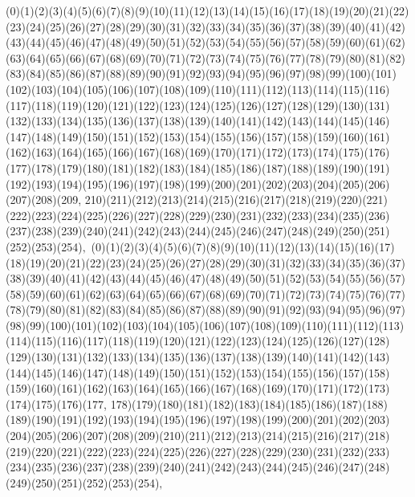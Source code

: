 \documentclass[12pt]{article}
\begin{document}
{(0)(1)(2)(3)(4)(5)(6)(7)(8)(9)(10)(11)(12)(13)(14)(15)(16)(17)(18)(19)(20)(21)(22)(23)(24)(25)(26)(27)(28)(29)(30)(31)(32)(33)(34)(35)(36)(37)(38)(39)(40)(41)(42)(43)(44)(45)(46)(47)(48)(49)(50)(51)(52)(53)(54)(55)(56)(57)(58)(59)(60)(61)(62)(63)(64)(65)(66)(67)(68)(69)(70)(71)(72)(73)(74)(75)(76)(77)(78)(79)(80)(81)(82)(83)(84)(85)(86)(87)(88)(89)(90)(91)(92)(93)(94)(95)(96)(97)(98)(99)(100)(101)(102)(103)(104)(105)(106)(107)(108)(109)(110)(111)(112)(113)(114)(115)(116)(117)(118)(119)(120)(121)(122)(123)(124)(125)(126)(127)(128)(129)(130)(131)(132)(133)(134)(135)(136)(137)(138)(139)(140)(141)(142)(143)(144)(145)(146)(147)(148)(149)(150)(151)(152)(153)(154)(155)(156)(157)(158)(159)(160)(161)(162)(163)(164)(165)(166)(167)(168)(169)(170)(171)(172)(173)(174)(175)(176)(177)(178)(179)(180)(181)(182)(183)(184)(185)(186)(187)(188)(189)(190)(191)(192)(193)(194)(195)(196)(197)(198)(199)(200)(201)(202)(203)(204)(205)(206)(207)(208)(209, 210)(211)(212)(213)(214)(215)(216)(217)(218)(219)(220)(221)(222)(223)(224)(225)(226)(227)(228)(229)(230)(231)(232)(233)(234)(235)(236)(237)(238)(239)(240)(241)(242)(243)(244)(245)(246)(247)(248)(249)(250)(251)(252)(253)(254)$
, 
$
(0)(1)(2)(3)(4)(5)(6)(7)(8)(9)(10)(11)(12)(13)(14)(15)(16)(17)(18)(19)(20)(21)(22)(23)(24)(25)(26)(27)(28)(29)(30)(31)(32)(33)(34)(35)(36)(37)(38)(39)(40)(41)(42)(43)(44)(45)(46)(47)(48)(49)(50)(51)(52)(53)(54)(55)(56)(57)(58)(59)(60)(61)(62)(63)(64)(65)(66)(67)(68)(69)(70)(71)(72)(73)(74)(75)(76)(77)(78)(79)(80)(81)(82)(83)(84)(85)(86)(87)(88)(89)(90)(91)(92)(93)(94)(95)(96)(97)(98)(99)(100)(101)(102)(103)(104)(105)(106)(107)(108)(109)(110)(111)(112)(113)(114)(115)(116)(117)(118)(119)(120)(121)(122)(123)(124)(125)(126)(127)(128)(129)(130)(131)(132)(133)(134)(135)(136)(137)(138)(139)(140)(141)(142)(143)(144)(145)(146)(147)(148)(149)(150)(151)(152)(153)(154)(155)(156)(157)(158)(159)(160)(161)(162)(163)(164)(165)(166)(167)(168)(169)(170)(171)(172)(173)(174)(175)(176)(177, 178)(179)(180)(181)(182)(183)(184)(185)(186)(187)(188)(189)(190)(191)(192)(193)(194)(195)(196)(197)(198)(199)(200)(201)(202)(203)(204)(205)(206)(207)(208)(209)(210)(211)(212)(213)(214)(215)(216)(217)(218)(219)(220)(221)(222)(223)(224)(225)(226)(227)(228)(229)(230)(231)(232)(233)(234)(235)(236)(237)(238)(239)(240)(241)(242)(243)(244)(245)(246)(247)(248)(249)(250)(251)(252)(253)(254)$
, 
$
}
\end{document}
